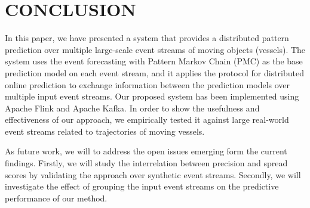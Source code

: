 
\section{CONCLUSION}
\label{sec:concl}
\par In this paper, we have presented a system that provides  a distributed pattern prediction over multiple large-scale event streams of moving objects (vessels). The system uses the event forecasting with Pattern Markov Chain (PMC) \cite{alevizos2017event} as the base prediction model on each event stream, and it applies the protocol for distributed online prediction \cite{kamp2014communication} to exchange information between the prediction models over multiple input event streams. Our proposed system has been implemented using Apache Flink and Apache Kafka. In order to show the usefulness and effectiveness of our approach, we empirically tested it against large real-world event streams related to trajectories of moving vessels.

\par As future work, we will to address the open issues emerging form the current findings. Firstly,  we will study the interrelation between precision and spread scores by validating the approach over synthetic event streams. Secondly, we will investigate the effect of grouping the input event streams on the predictive performance of our method.